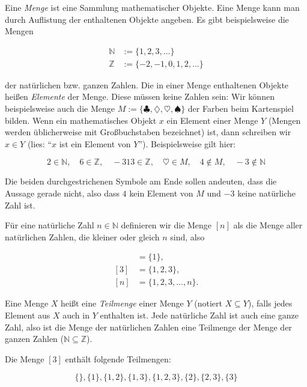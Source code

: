 \documentclass{uebungszettel}
\newcommand{\N}{\mathbb{N}} %
\newcommand{\Z}{\mathbb{Z}}
\begin{document}
\pagestyle{empty}


Eine \emph{Menge} ist eine Sammlung mathematischer Objekte. Eine Menge kann man durch Auflistung der enthaltenen Objekte angeben. Es gibt beispielsweise die Mengen

\begin{align*}
  \N & := \{ 1, 2, 3, ... \} \\
  \Z & := \{ -2, -1, 0, 1, 2, ... \}
\end{align*}

der natürlichen bzw. ganzen Zahlen. Die in einer Menge enthaltenen Objekte heißen \emph{Elemente} der Menge. Diese müssen keine Zahlen sein: Wir können beispielsweise auch die Menge $M := \{ \clubsuit, \diamondsuit, \heartsuit, \spadesuit \}$ der Farben beim Kartenspiel bilden. Wenn ein mathematisches Objekt $x$ ein Element einer Menge $Y$ (Mengen werden üblicherweise mit Großbuchstaben bezeichnet) ist, dann schreiben wir $x \in Y$ (lies: "`$x$ ist ein Element von $Y$"'). Beispielsweise gilt hier:

\[
  2 \in \N, \quad 6 \in \Z, \quad -313 \in \Z, \quad \heartsuit \in M, \quad 4 \not\in M, \quad -3 \not\in \N
\]

Die beiden durchgestrichenen Symbole am Ende sollen andeuten, dass die Aussage gerade nicht, also dass $4$ kein Element von $M$ und $-3$ keine natürliche Zahl ist.

Für eine natürliche Zahl $n \in \N$ definieren wir die Menge $[n]$ als die Menge aller natürlichen Zahlen, die kleiner oder gleich $n$ sind, also

\begin{align*}
  [1] &= \{ 1 \}, \\
  [3] &= \{ 1, 2, 3 \}, \\
  [n] &= \{ 1, 2, 3, ..., n \}.
\end{align*}

Eine Menge $X$ heißt eine \emph{Teilmenge} einer Menge $Y$ (notiert $X \subseteq Y$), falls jedes Element aus $X$ auch in $Y$ enthalten ist. Jede natürliche Zahl ist auch eine ganze Zahl, also ist die Menge der natürlichen Zahlen eine Teilmenge der Menge der ganzen Zahlen ($\N \subseteq \Z$).

Die Menge $[3]$ enthält folgende Teilmengen:

\[
  \{ \}, \{ 1 \}, \{ 1, 2 \}, \{ 1, 3 \}, \{ 1, 2, 3 \}, \{ 2 \}, \{ 2, 3 \}, \{ 3 \}
\]
\end{document}
